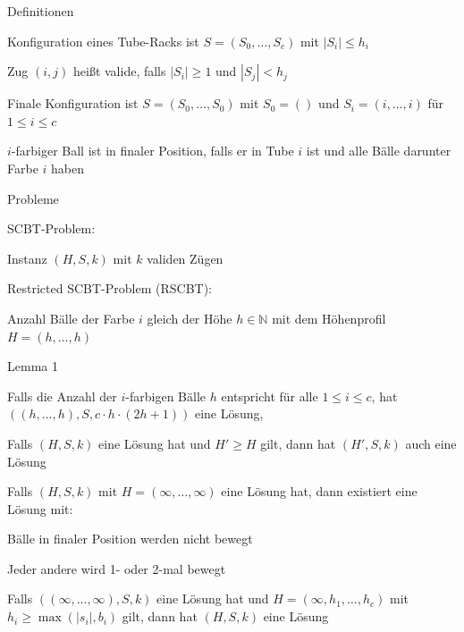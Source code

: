 \documentclass{beamer}
\begin{document}
		
\begin{frame}{Definitionen}
	\begin{pointlist}
		\item Konfiguration eines Tube-Racks ist $S=(S_0,\dots,S_c)$ mit $|S_i| \leq h_i$
		\item Zug $(i,j)$ heißt valide, falls $|S_i|\geq 1$ und $|S_j| < h_j$
		\item Finale Konfiguration ist $S=(S_0,\dots, S_0)$ mit $S_0 = ()$ und $S_i =(i,\dots,i)$ für $1\leq i \leq c$
		\item $i$-farbiger Ball ist in finaler Position, falls er in Tube $i$ ist und alle Bälle darunter Farbe $i$ haben
	\end{pointlist}
\end{frame}

\begin{frame}{Probleme}
	\begin{pointlist}
		\item SCBT-Problem:
		\begin{arrowlist}
 			\item Instanz $(H,S,k)$ mit $k$ validen Zügen
		\end{arrowlist}
		\item Restricted SCBT-Problem (RSCBT):
		\begin{arrowlist}
 			\item Anzahl Bälle der Farbe $i$ gleich der Höhe $h\in\mathbb{N}$ mit dem Höhenprofil $H=(h,\dots,h)$
		\end{arrowlist}
	\end{pointlist}
\end{frame}

\begin{frame}{Lemma 1}
\begin{enumlist}
\item Falls die Anzahl der $i$-farbigen Bälle $h$ entspricht für alle $1 \leq i \leq c$, hat $((h,\dots,h),S,c\cdot h\cdot (2h+1))$ eine Lösung, 
\item Falls $(H,S,k)$ eine Lösung hat und $H' \geq H$ gilt, dann hat $(H',S,k)$ auch eine Lösung
\item Falls $(H,S,k)$ mit $H=(\infty,\dots, \infty)$ eine Lösung hat, dann existiert eine Lösung mit: \begin{pointlist}
\item Bälle in finaler Position werden nicht bewegt
\item Jeder andere wird 1- oder 2-mal bewegt
\end{pointlist}
\item Falls $((\infty, \dots,\infty),S,k)$ eine Lösung hat und $H=(\infty, h_1,\dots, h_c)$ mit $h_i \geq \max(|s_i|,b_i)$ gilt, dann hat $(H,S,k)$ eine Lösung
\end{enumlist}
\end{frame}
\end{document}
